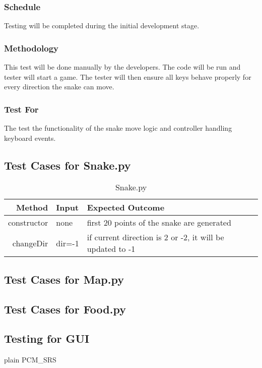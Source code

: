 \documentclass[12pt]{article}
\begin{document}
\subsubsection*{Schedule}
Testing will be completed during the initial development stage.
\subsubsection*{Methodology}
This test will be done manually by the developers. The code will be run and tester will start a game. The tester will then ensure all keys behave properly for every direction the snake can move.
\subsubsection*{Test For}
The test the functionality of the snake move logic and controller handling keyboard events.\newline


\subsection{Test Cases for Snake.py}

\begin{center}
	\begin{longtable}{ | r | p{4cm} | p{4cm} | p{4cm} |}
	\caption{Snake.py} \\ \hline \label{TblInputVar} 
	Method & Input & Expected Outcome\\ \hline
	constructor & none &  first 20 points of the snake are generated\\ \hline
	changeDir & dir=-1 & if current direction is 2 or -2, it will be updated to -1\\ \hline
	\end{longtable}
\end{center}




\subsection{Test Cases for Map.py}
\subsection{Test Cases for Food.py}
\subsection{Testing for GUI}




 {plain}
 {PCM_SRS}
\end{document}
